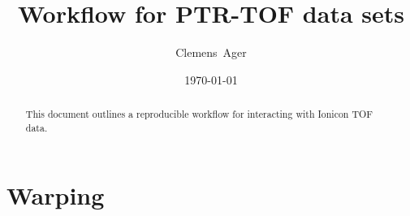 \documentclass[twocolumn]{article}
\title{Workflow for PTR-TOF data sets}
\author{Clemens~Ager}
\date{\today}
\begin{document}
\maketitle

\begin{abstract}
  This document outlines a reproducible workflow for interacting with
  Ionicon TOF data.  
\end{abstract}


\setcounter{tocdepth}{2}
\tableofcontents



\section{Warping}






\end{document}
